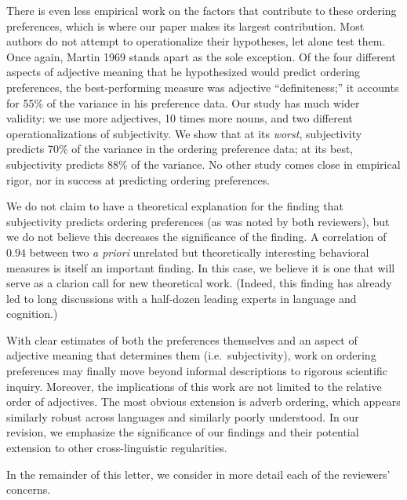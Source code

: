 \documentclass[12pt]{article}
\begin{document}
There is even less empirical work on the factors that contribute to these ordering preferences, which is where our paper makes its largest contribution. Most authors do not attempt to operationalize their hypotheses, let alone test them. Once again, Martin 1969 stands apart as the sole exception. Of the four different aspects of adjective meaning that he hypothesized would predict ordering preferences, the best-performing measure was adjective ``definiteness;'' it accounts for 55\% of the variance in his preference data. Our study has much wider validity: we use more adjectives, 10 times more nouns, and two different operationalizations of subjectivity. We show that at its \emph{worst}, subjectivity predicts 70\% of the variance in the ordering preference data; at its best, subjectivity predicts 88\% of the variance. %
No other study comes close in empirical rigor, nor in success at predicting ordering preferences.

We do not claim to have a theoretical explanation for the finding that subjectivity predicts ordering preferences (as was noted by both reviewers), but we do not believe this decreases the significance of the finding. 
A correlation of $0.94$ between two \emph{a priori} unrelated but theoretically interesting behavioral measures is itself an important finding. In this case, we believe it is one that will serve as a clarion call for new theoretical work.
(Indeed, this finding has already led to long discussions with a half-dozen leading experts in language and cognition.)

With clear estimates of both the preferences themselves and an aspect of adjective meaning that determines them (i.e.~subjectivity), work on ordering preferences may finally move beyond informal descriptions to rigorous scientific inquiry. 
%
Moreover, the implications of this work are not limited to the relative order of adjectives. The most obvious extension is adverb ordering, which appears similarly robust across languages and similarly poorly understood. In our revision, we emphasize the significance of our findings and their potential extension to other cross-linguistic regularities.

In the remainder of this letter, we consider in more detail each of the reviewers' concerns.
\end{document}
